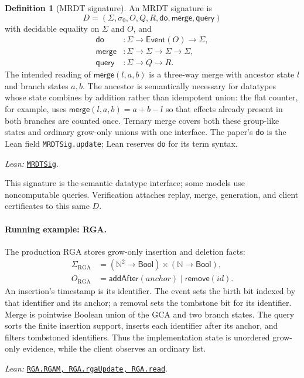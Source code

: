 \documentclass[11pt]{article}
\theoremstyle{definition}
\newtheorem{definition}[theorem]{Definition}
\newcommand{\N}{\mathbb N}
\newcommand{\State}{\Sigma}
\newcommand{\Event}{\mathsf{Event}}
\newcommand{\init}{\sigma_0}
\newcommand{\doop}{\mathsf{do}}
\newcommand{\merge}{\mathsf{merge}}
\newcommand{\query}{\mathsf{query}}
\newcommand{\lean}[1]{\texttt{#1}}
\newcommand{\src}[2]{\href{../../#1}{\texttt{#2}}}
\newcommand{\anchor}[2]{\par\smallskip\noindent\emph{Lean: }\src{#1}{#2}.}
\begin{document}
\begin{definition}[MRDT signature]
An MRDT signature is
\[
 D=(\State,\init,O,Q,R,\doop,\merge,\query)
\]
with decidable equality on $\State$ and $O$, and
\[
\begin{aligned}
 \doop&:\State\to\Event(O)\to\State,\\
 \merge&:\State\to\State\to\State\to\State,\\
 \query&:\State\to Q\to R.
\end{aligned}
\]
The intended reading of $\merge(l,a,b)$ is a three-way merge with ancestor
state $l$ and branch states $a,b$.
The ancestor is semantically necessary for datatypes whose state combines by
addition rather than idempotent union: the flat counter, for example, uses
$\merge(l,a,b)=a+b-l$ so that effects already present in both branches are
counted once.  Ternary merge covers both these group-like states and ordinary
grow-only unions with one interface.
The paper's $\doop$ is the Lean field \lean{MRDTSig.update}; Lean reserves
\lean{do} for its term syntax.
\anchor{Sal/MRDTs/Framework/Signature.lean}{MRDTSig}
\end{definition}

This signature is the semantic datatype interface; some models use
noncomputable queries. Verification attaches
replay, merge, generation, and client certificates to this same $D$.

\paragraph{Running example: RGA.}
The production RGA stores grow-only insertion and deletion facts:
\[
\begin{aligned}
 \State_{\mathrm{RGA}}
   &=(\N^2\to\mathsf{Bool})\times(\N\to\mathsf{Bool}),\\
 O_{\mathrm{RGA}}&=\mathsf{addAfter}(\mathit{anchor})
                 \mid\mathsf{remove}(\mathit{id}).
\end{aligned}
\]
An insertion's timestamp is its identifier. The event sets the birth bit
indexed by that identifier and its anchor; a removal sets the tombstone bit
for its identifier. Merge is
pointwise Boolean union of the GCA and two branch states. The query sorts the
finite insertion support, inserts each identifier after its anchor, and
filters tombstoned identifiers. Thus the implementation state is unordered
grow-only evidence, while the client observes an ordinary list.
\anchor{Sal/MRDTs/Instances/RGA.lean}{RGA.RGAM, RGA.rgaUpdate, RGA.read}
\end{document}
